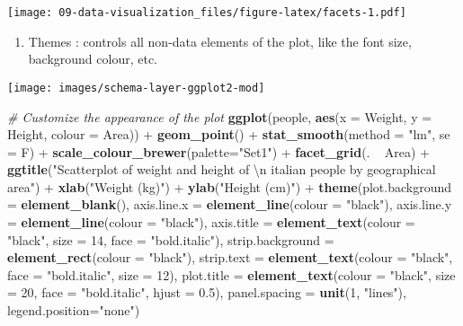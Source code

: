 \documentclass[]{book}
\newenvironment{Shaded}{\begin{snugshade}}{\end{snugshade}}
\newcommand{\KeywordTok}[1]{\textcolor[rgb]{0.13,0.29,0.53}{\textbf{{#1}}}}
\newcommand{\DataTypeTok}[1]{\textcolor[rgb]{0.13,0.29,0.53}{{#1}}}
\newcommand{\DecValTok}[1]{\textcolor[rgb]{0.00,0.00,0.81}{{#1}}}
\newcommand{\FloatTok}[1]{\textcolor[rgb]{0.00,0.00,0.81}{{#1}}}
\newcommand{\CharTok}[1]{\textcolor[rgb]{0.31,0.60,0.02}{{#1}}}
\newcommand{\StringTok}[1]{\textcolor[rgb]{0.31,0.60,0.02}{{#1}}}
\newcommand{\CommentTok}[1]{\textcolor[rgb]{0.56,0.35,0.01}{\textit{{#1}}}}
\newcommand{\NormalTok}[1]{{#1}}
\providecommand{\tightlist}{%
  \setlength{\itemsep}{0pt}\setlength{\parskip}{0pt}}
\def\tightlist{}
\begin{document}
\texttt{[image: 09-data-visualization\_files/figure-latex/facets-1.pdf]}

\begin{enumerate}
\def\labelenumi{\arabic{enumi}.}
\setcounter{enumi}{5}
\tightlist
\item
   {Themes} : controls all non-data elements of the plot, like the font
  size, background colour, etc.
\end{enumerate}

\texttt{[image: images/schema-layer-ggplot2-mod]}

\begin{Shaded}
\begin{Highlighting}[]
\CommentTok{# Customize the appearance of the plot}
\KeywordTok{ggplot}\NormalTok{(people, }\KeywordTok{aes}\NormalTok{(}\DataTypeTok{x =} \NormalTok{Weight, }\DataTypeTok{y =} \NormalTok{Height, }\DataTypeTok{colour =} \NormalTok{Area)) +}
\StringTok{  }\KeywordTok{geom_point}\NormalTok{() +}
\StringTok{  }\KeywordTok{stat_smooth}\NormalTok{(}\DataTypeTok{method =} \StringTok{"lm"}\NormalTok{, }\DataTypeTok{se =} \NormalTok{F) +}
\StringTok{  }\KeywordTok{scale_colour_brewer}\NormalTok{(}\DataTypeTok{palette=}\StringTok{"Set1"}\NormalTok{) +}
\StringTok{  }\KeywordTok{facet_grid}\NormalTok{(. ~}\StringTok{ }\NormalTok{Area) +}
\StringTok{  }\KeywordTok{ggtitle}\NormalTok{(}\StringTok{"Scatterplot of weight and height of }\CharTok{\textbackslash{}n}\StringTok{ italian people by geographical area"}\NormalTok{) +}\StringTok{ }
\StringTok{    }\KeywordTok{xlab}\NormalTok{(}\StringTok{"Weight (kg)"}\NormalTok{) +}
\StringTok{    }\KeywordTok{ylab}\NormalTok{(}\StringTok{"Height (cm)"}\NormalTok{) +}
\StringTok{  }\KeywordTok{theme}\NormalTok{(}\DataTypeTok{plot.background =} \KeywordTok{element_blank}\NormalTok{(),}
    \DataTypeTok{axis.line.x =} \KeywordTok{element_line}\NormalTok{(}\DataTypeTok{colour =} \StringTok{"black"}\NormalTok{),}
    \DataTypeTok{axis.line.y =} \KeywordTok{element_line}\NormalTok{(}\DataTypeTok{colour =} \StringTok{"black"}\NormalTok{),}
    \DataTypeTok{axis.title =} \KeywordTok{element_text}\NormalTok{(}\DataTypeTok{colour =} \StringTok{"black"}\NormalTok{, }\DataTypeTok{size =} \DecValTok{14}\NormalTok{, }\DataTypeTok{face =} \StringTok{"bold.italic"}\NormalTok{),}
    \DataTypeTok{strip.background =} \KeywordTok{element_rect}\NormalTok{(}\DataTypeTok{colour =} \StringTok{"black"}\NormalTok{),}
    \DataTypeTok{strip.text =} \KeywordTok{element_text}\NormalTok{(}\DataTypeTok{colour =} \StringTok{"black"}\NormalTok{, }\DataTypeTok{face =} \StringTok{"bold.italic"}\NormalTok{, }\DataTypeTok{size =} \DecValTok{12}\NormalTok{),}
    \DataTypeTok{plot.title =} \KeywordTok{element_text}\NormalTok{(}\DataTypeTok{colour =} \StringTok{"black"}\NormalTok{, }\DataTypeTok{size =} \DecValTok{20}\NormalTok{, }\DataTypeTok{face =} \StringTok{"bold.italic"}\NormalTok{, }\DataTypeTok{hjust =} \FloatTok{0.5}\NormalTok{),}
    \DataTypeTok{panel.spacing =} \KeywordTok{unit}\NormalTok{(}\DecValTok{1}\NormalTok{, }\StringTok{"lines"}\NormalTok{),}
    \DataTypeTok{legend.position=}\StringTok{"none"}\NormalTok{)}
\end{Highlighting}
\end{Shaded}
\end{document}

